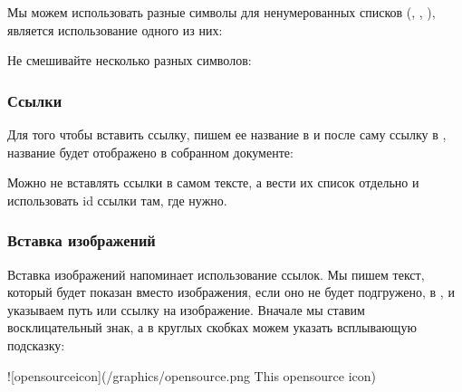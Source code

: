 \documentclass[letterpaper,10pt,russian]{sphinxmanual}
\begin{document}
\sphinxAtStartPar
{}

\sphinxAtStartPar
Мы можем использовать разные символы для ненумерованных списков (\sphinxcode{\sphinxupquote{\sphinxhyphen{}}}, \sphinxcode{\sphinxupquote{*}}, \sphinxcode{\sphinxupquote{+}}),  является использование одного из них:

\sphinxAtStartPar
{}

\sphinxAtStartPar
Не смешивайте несколько разных символов:

\sphinxAtStartPar
{}


\subsubsection{Ссылки}
\label{\detokenize{educational_materials/docs/content:id7}}
\sphinxAtStartPar
Для того чтобы вставить ссылку, пишем ее название в \sphinxcode{\sphinxupquote{{[}{]}}} и после саму ссылку в \sphinxcode{\sphinxupquote{()}}, название будет отображено в собранном документе:

\sphinxAtStartPar
{}

\sphinxAtStartPar
Можно не вставлять ссылки в самом тексте, а вести их список отдельно и использовать id ссылки там, где нужно.

\sphinxAtStartPar
{}


\subsubsection{Вставка изображений}
\label{\detokenize{educational_materials/docs/content:id8}}
\sphinxAtStartPar
Вставка изображений напоминает использование ссылок. Мы пишем текст, который будет показан вместо изображения, если оно не будет подгружено, в \sphinxcode{\sphinxupquote{{[}{]}}}, и указываем путь или ссылку на изображение. Вначале мы ставим восклицательный знак, а в круглых скобках можем указать всплывающую подсказку:

\begin{sphinxVerbatim}[commandchars=\\\{\}]
![opensource\PYGZus{}icon](/graphics/opensource.png \PYGZdq{}This opensource icon\PYGZdq{})
\end{sphinxVerbatim}

\sphinxAtStartPar
{}
\end{document}
